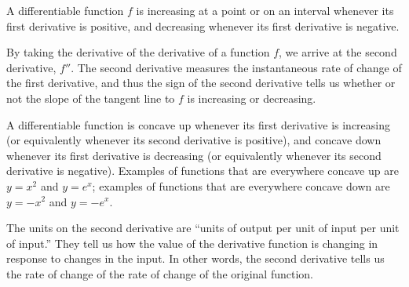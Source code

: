 \begin{summary}
\item A differentiable function $f$ is increasing at a point or on an interval whenever its first derivative is positive, and decreasing whenever its first derivative is negative.
\item By taking the derivative of the derivative of a function $f$, we arrive at the second derivative, $f''$.  The second derivative measures the instantaneous rate of change of the first derivative, and thus the sign of the second derivative tells us whether or not the slope of the tangent line to $f$ is increasing or decreasing.
\item A differentiable function is concave up whenever its first derivative is increasing (or equivalently whenever its second derivative is positive), and concave down whenever its first derivative is decreasing (or equivalently whenever its second derivative is negative).  Examples of functions that are everywhere concave up are $y = x^2$ and $y = e^x$; examples of functions that are everywhere concave down are $y = -x^2$ and $y = -e^x$.
\item The units on the second derivative are ``units of output per unit of input per unit of input.''  They tell us how the value of the derivative function is changing in response to changes in the input.  In other words, the second derivative tells us the rate of change of the rate of change of the original function.
\end{summary}

\nin \hrulefill

 

\clearpage
